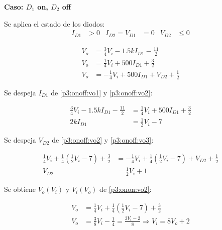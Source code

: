 %
%
%

\bigskip

\textbf{Caso: $D_1$ on, $D_2$ off}

Se aplica el estado de los diodos:
\begin{align*}
  I_{D1} &> 0
  &
  I_{D2} = V_{D1} &= 0
  &
  V_{D2} &\leq 0
\end{align*}

\begin{align}
  V_o &=
    \frac{3}{4} V_i
    - 1.5k I_{D1}
    - \frac{11}{2} \label{p3:onoff:vo1}
  \\
  V_o &=
    \frac{1}{4} V_i
    + 500 I_{D1}
    + \frac{3}{2} \label{p3:onoff:vo2}
  \\
  V_o &=
    - \frac{1}{4} V_i
    + 500 I_{D1}
    + V_{D2}
    + \frac{1}{2} \label{p3:onoff:vo3}
\end{align}

Se despeja $I_{D1}$ de \ref{p3:onoff:vo1} y \ref{p3:onoff:vo2}:

\begin{align*}
  \frac{3}{4} V_i - 1.5k I_{D1} - \frac{11}{2} &=
  \frac{1}{4} V_i + 500 I_{D1}  + \frac{3}{2}
  \\
  2k I_{D1} &= \frac{1}{2} V_i - 7
\end{align*}

Se despeja $V_{D2}$ de \ref{p3:onoff:vo2} y \ref{p3:onoff:vo3}:

\begin{align*}
  \frac{1}{4} V_i   + \frac{1}{4} \left( \frac{1}{2} V_i - 7 \right) + \frac{3}{2} &=
  - \frac{1}{4} V_i + \frac{1}{4} \left( \frac{1}{2} V_i - 7 \right) + V_{D2} + \frac{1}{2}
  \\
  V_{D2} &= \frac{1}{2} V_i + 1
\end{align*}

Se obtiene $V_o(V_i)$ y $V_i(V_o)$ de \ref{p3:onon:vo2}:

\begin{align*}
  V_o &=
    \frac{1}{4} V_i
    + \frac{1}{4} \left( \frac{1}{2} V_i - 7 \right)
    + \frac{3}{2}
  \\
  V_o &= \frac{3}{8} V_i - \frac{1}{4} = \frac{3 V_i - 2}{8} \Rightarrow V_i = 8 V_o + 2
\end{align*}

